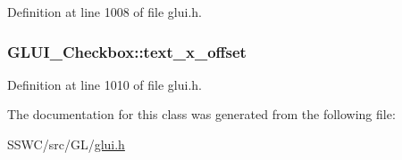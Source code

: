 Definition at line 1008 of file glui.\+h.

\hypertarget{class_g_l_u_i___checkbox_ac3cec38298f8c0f6a1573070c759fcbe}{
\subsubsection[{text\+\_\+x\+\_\+offset}]{ G\+L\+U\+I\+\_\+\+Checkbox\+::text\+\_\+x\+\_\+offset}}\label{class_g_l_u_i___checkbox_ac3cec38298f8c0f6a1573070c759fcbe}


Definition at line 1010 of file glui.\+h.



The documentation for this class was generated from the following file\+:\begin{DoxyCompactItemize}
\item 
S\+S\+W\+C/src/\+G\+L/\hyperlink{glui_8h}{glui.\+h}\end{DoxyCompactItemize}
